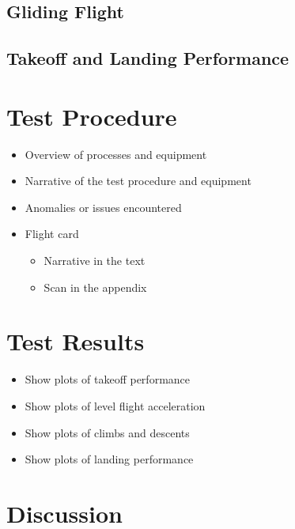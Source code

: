 \documentclass[conf]{new-aiaa}
\begin{document}
\subsection{Gliding Flight}

\subsection{Takeoff and Landing Performance}

\section{Test Procedure}

\begin{itemize}
	\item Overview of processes and equipment
	\item Narrative of the test procedure and equipment
	\item Anomalies or issues encountered
	\item Flight card
	\begin{itemize}
		\item Narrative in the text
		\item Scan in the appendix
	\end{itemize}
\end{itemize}

\section{Test Results}

\begin{itemize}
	\item Show plots of takeoff performance
	\item Show plots of level flight acceleration
	\item Show plots of climbs and descents
	\item Show plots of landing performance
\end{itemize}

\section{Discussion}
\end{document}
